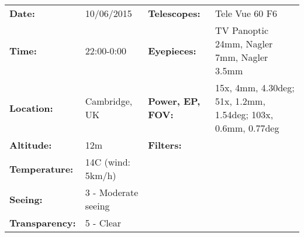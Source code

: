 \begin{tabular}{ p{0.9in} p{1.3in} p{1.2in} p{5.2in}}
{\bf Date:} & 10/06/2015 & {\bf Telescopes:} & Tele Vue 60 F6 \\ 
{\bf Time:} & 22:00-0:00 & {\bf Eyepieces:} & TV Panoptic 24mm, Nagler 7mm, Nagler 3.5mm \\ 
{\bf Location:} & Cambridge, UK & {\bf Power, EP, FOV:} & 15x, 4mm, 4.30deg; 51x, 1.2mm, 1.54deg; 103x, 0.6mm, 0.77deg \\ 
{\bf Altitude:} & 12m & {\bf Filters:} &  \\ 
{\bf Temperature:} & 14C (wind: 5km/h) & & \\ 
{\bf Seeing:} & 3 - Moderate seeing & & \\ 
{\bf Transparency:} & 5 - Clear & & \\ 
\end{tabular}
\centering 
